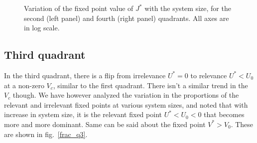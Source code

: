 \documentclass[12pt,twoside]{article}
\numberwithin{equation}{section}
\begin{document}
\begin{figure}[htpb!]
\caption{Variation of the fixed point value of $J^*$  with the system size, for the second (left panel) and fourth (right panel) quadrants. All axes are in log scale.}
\label{J_D_q24}
\end{figure}
\subsection{Third quadrant}
In the third quadrant, there is a flip from irrelevance \(U^*=0\) to relevance \(U^*<U_0\) at a non-zero \(V_c\), similar to the first quadrant. There isn't a similar trend in the \(V_c\) though. We have however analyzed the variation in the proportions of the relevant and irrelevant fixed points at various system sizes, and noted that with increase in system size, it is the relevant fixed point \(U^*<U_0<0\) that becomes more and more dominant. Same can be said about the fixed point \(V^*>V_0\). These are shown in fig.~\ref{frac_q3}.
\end{document}
